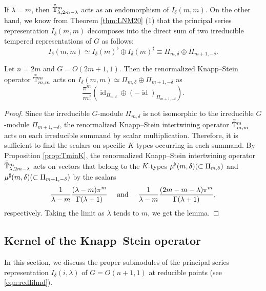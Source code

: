 If $\lambda=m$,
 then $\tilde{\tilde{{\mathbb{T}}}}_{{\lambda},{2m-\lambda}}^{{m}}$ acts
 as an endomorphism
 of $I_{\delta}(m,m)$.  
On the other hand,
 we know from Theorem \ref{thm:LNM20} (1)
 that the principal series representation $I_{\delta}(m, m)$
 decomposes into the direct sum
 of two irreducible 
 tempered representations
 of $G$ as follows:
\[
   I_{\delta}(m, m)
   \simeq 
   I_{\delta}(m)^{\flat} \oplus I_{\delta}(m)^{\sharp}
   \equiv
   \Pi_{m, \delta} \oplus \Pi_{m+1, -\delta}.  
\]
\begin{lemma}
\label{lem:161745}
Let $n=2m$ and $G=O(2m+1,1)$.  
Then the 
 renormalized Knapp--Stein operator
 $\tilde{\tilde{{\mathbb{T}}}}_{{m},{m}}^{{m}}$
 acts on $I_{\delta}(m, m)\simeq \Pi_{m,\delta} \oplus \Pi_{m+1,-\delta}$
 as
\[
   \frac{\pi^{m}}{m!}
   ({\operatorname{id}}_{\Pi_{m, \delta}} 
    \oplus 
    (-{\operatorname{id}})_{\Pi_{m+1, -\delta}} ).  
\]
\end{lemma}
\begin{proof}
Since the irreducible $G$-module $\Pi_{m, \delta}$ is not isomorphic to 
the irreducible $G$-module $\Pi_{m+1, -\delta}$, 
 the renormalized Knapp--Stein intertwining operator $\tilde{\tilde{{\mathbb{T}}}}_{{m},{m}}^{{m}}$ acts on each irreducible summand
 by scalar multiplication.  
Therefore, 
 it is sufficient to find the scalars
 on specific $K$-types occurring 
 in each summand.  
By Proposition \ref{prop:TminK}, 
 the renormalized Knapp--Stein intertwining operator
 $\tilde{\tilde{{\mathbb{T}}}}_{{\lambda},{2m-\lambda}}^{{m}}$ acts on vectors
 that belong to the $K$-types
 $\mu^{\flat} (m, \delta)(\subset \Pi_{m,\delta})$
 and $\mu^{\sharp}(m, \delta)(\subset \Pi_{m+1,-\delta})$
 by the scalars
\[
   \text{
   $\frac{1}{\lambda-m} \frac{(\lambda-m)\pi^{m}}{\Gamma(\lambda+1)}$
\quad
   and 
\quad
   $\frac{1}{\lambda-m} \frac{(2m-m- \lambda)\pi^m}{\Gamma(\lambda+1)}$, 
}
\]
respectively.  
Taking the limit as $\lambda$ tends to $m$, 
 we get the lemma.  
\end{proof}



\subsection{Kernel of the Knapp--Stein operator}
\label{subsec:KerKnSt}
In this section,
 we discuss the proper submodules
 of the principal series representation
 $I_{\delta}(i,\lambda)$ of $G=O(n+1,1)$
 at reducible points
 (see \eqref{eqn:redIilmd}).  

